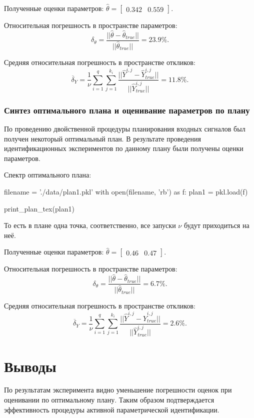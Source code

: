 \documentclass[a4paper,14pt]{extarticle}
\begin{document}
Полученные оценки параметров:
$\hat{\theta} = \begin{bmatrix} 0.342 & 0.559 \end{bmatrix}$.

\newcommand{\rtol}[2]{\frac{||\hat{#1}#2 -
{\hat{#1}#2_{true}}||}{||\hat{#1}#2_{true}||}}

Относительная погрешность в пространстве параметров:
\[
	\delta_{\theta} = \rtol{\theta}{} = 23.9\%.
\]

Средняя относительная погрешность в пространстве откликов:
\[
	\overline{\delta}_Y = \frac{1}{\nu}
		\sum\limits_{i=1}^{q}\sum\limits_{j=1}^{k_i} \rtol{Y}{^{i,j}} = 11.8 \%.
\]

\subsubsection{Синтез оптимального плана и оценивание параметров по плану}

По проведению двойственной процедуры планирования входных сигналов был получен
некоторый оптимальный план. В результате проведения идентификационных экспериментов по
данному плану были получены оценки параметров.

\newpage
Спектр оптимального плана:

\begin{pycode}
filename = './data/plan1.pkl'
with open(filename, 'rb') as f:
    plan1 = pkl.load(f)

print_plan_tex(plan1)
\end{pycode}

То есть в плане одна точка, соответственно, все запуски $\nu$ будут приходиться
на неё.

Полученные оценки параметров:
$\hat{\theta} = \begin{bmatrix} 0.46 & 0.47 \end{bmatrix}$.

Относительная погрешность в пространстве параметров:
\[
	\delta_{\theta} = \rtol{\theta}{} = 6.7\%.
\]

Средняя относительная погрешность в пространстве откликов:
\[
	\overline{\delta}_Y = \frac{1}{\nu}
		\sum\limits_{i=1}^{q}\sum\limits_{j=1}^{k_i} \rtol{Y}{^{i,j}} = 2.6 \%.
\]

\section{Выводы}

По результатам эксперимента видно уменьшение погрешности оценок при оценивании
по оптимальному плану. Таким образом подтверждается эффективность процедуры
активной параметрической идентификации.
\end{document}
